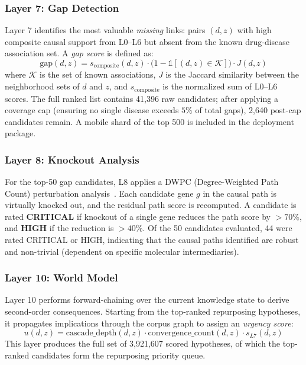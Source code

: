 \documentclass[11pt]{article}
\begin{document}
\subsubsection{Layer 7: Gap Detection}
\label{sec:l7}
Layer 7 identifies the most valuable \emph{missing} links: pairs
$(d, z)$ with high composite causal support from L0--L6 but absent
from the known drug-disease association set.
A \emph{gap score} is defined as:
\[
  \mathrm{gap}(d, z) = s_{\mathrm{composite}}(d, z) \cdot
    \bigl(1 - \mathbb{1}[(d,z) \in \mathcal{K}]\bigr) \cdot
    J(d, z)
\]
where $\mathcal{K}$ is the set of known associations, $J$ is the
Jaccard similarity between the neighborhood sets of $d$ and $z$,
and $s_{\mathrm{composite}}$ is the normalized sum of L0--L6 scores.
The full ranked list contains 41,396 raw candidates;
after applying a coverage cap (ensuring no single disease exceeds
$5\%$ of total gaps), 2,640 post-cap candidates remain.
A mobile shard of the top 500 is included in the deployment package.

\subsubsection{Layer 8: Knockout Analysis}
\label{sec:l8}
For the top-50 gap candidates, L8 applies a DWPC (Degree-Weighted Path Count)
perturbation analysis~\cite{himmelstein2017systematic}.
Each candidate gene $g$ in the causal path is virtually knocked out,
and the residual path score is recomputed.
A candidate is rated \textbf{CRITICAL} if knockout of a single gene
reduces the path score by $>70\%$, and \textbf{HIGH} if the reduction
is $>40\%$.
Of the 50 candidates evaluated, 44 were rated CRITICAL or HIGH,
indicating that the causal paths identified are robust and non-trivial
(dependent on specific molecular intermediaries).

\subsubsection{Layer 10: World Model}
\label{sec:l10}
Layer 10 performs forward-chaining over the current knowledge state
to derive second-order consequences.
Starting from the top-ranked repurposing hypotheses, it propagates
implications through the corpus graph to assign an \emph{urgency score}:
\[
  u(d, z) = \mathrm{cascade\_depth}(d, z) \cdot
             \mathrm{convergence\_count}(d, z) \cdot
             s_{L7}(d, z)
\]
This layer produces the full set of 3,921,607 scored hypotheses, of which
the top-ranked candidates form the repurposing priority queue.
\end{document}
